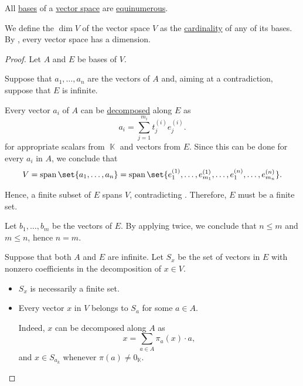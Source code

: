\begin{proposition}\label{thm:vector_space_dimension}
  All \hyperref[def:hamel_basis]{bases} of a \hyperref[def:vector_space]{vector space} are \hyperref[def:equinumerosity]{equinumerous}.

  We define the  \( \dim V \) of the vector space \( V \) as the \hyperref[thm:cardinality_existence]{cardinality} of any of its bases. By , every vector space has a dimension.
\end{proposition}
\begin{proof}
  Let \( A \) and \( E \) be bases of \( V \).

   Suppose that \( a_1, \ldots, a_n \) are the vectors of \( A \) and, aiming at a contradiction, suppose that \( E \) is infinite.

  Every vector \( a_i \) of \( A \) can be \hyperref[def:basis_decomposition]{decomposed} along \( E \) as
  \begin{equation*}
    a_i = \sum_{j=1}^{m_i} t^{(i)}_j e^{(i)}_j.
  \end{equation*}
  for appropriate scalars from \( \BbbK \) and vectors from \( E \). Since this can be done for every \( a_i \) in \( A \), we conclude that
  \begin{equation*}
    V = \linspan\set{ a_1, \ldots, a_n } = \linspan\set{ e^{(1)}_1, \ldots, e^{(1)}_{m_1}, \ldots, e^{(n)}_1, \ldots, e^{(n)}_{m_n} }.
  \end{equation*}

  Hence, a finite subset of \( E \) spans \( V \), contradicting . Therefore, \( E \) must be a finite set.

  Let \( b_1, \ldots, b_m \) be the vectors of \( E \). By applying  twice, we conclude that \( n \leq m \) and \( m \leq n \), hence \( n = m \).

   Suppose that both \( A \) and \( E \) are infinite. Let \( S_x \) be the set of vectors in \( E \) with nonzero coefficients in the decomposition of \( x \in V \).
  \begin{itemize}
    \item \( S_x \) is necessarily a finite set.
    \item Every vector \( x \) in \( V \) belongs to \( S_a \) for some \( a \in A \).

    Indeed, \( x \) can be decomposed along \( A \) as
    \begin{equation*}
      x = \sum_{a \in A} \pi_a(x) \cdot a,
    \end{equation*}
    and \( x \in S_{a_k} \) whenever \( \pi(a) \neq 0_\BbbK \).


\end{itemize}
\end{proof}
